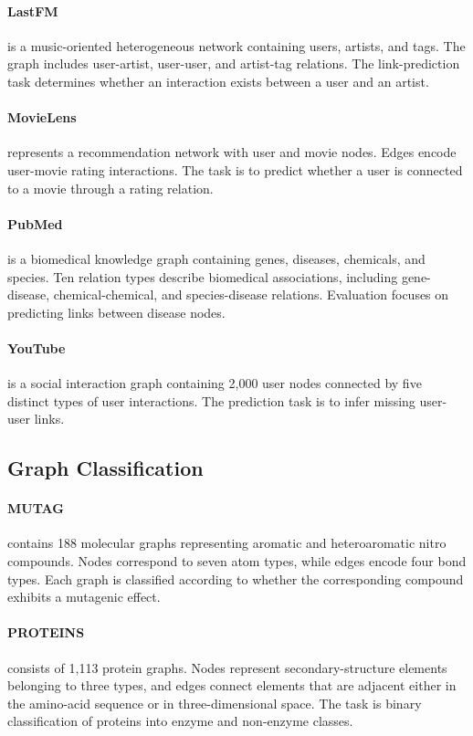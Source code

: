 \paragraph{LastFM}
is a music-oriented heterogeneous network containing users, artists,
and tags. The graph includes user-artist, user-user, and artist-tag
relations. The link-prediction task determines whether an interaction exists
between a user and an artist.

\paragraph{MovieLens}
represents a recommendation network with user and movie nodes.
Edges encode user-movie rating interactions. The task is to predict whether a
user is connected to a movie through a rating relation.

\paragraph{PubMed}
is a biomedical knowledge graph containing genes, diseases, chemicals,
and species. Ten relation types describe biomedical associations, including
gene-disease, chemical-chemical, and species-disease relations. Evaluation
focuses on predicting links between disease nodes.

\paragraph{YouTube}
is a social interaction graph containing 2,000 user nodes connected by
five distinct types of user interactions. The prediction task is to infer
missing user-user links.

\subsection{Graph Classification}

\paragraph{MUTAG}
contains 188 molecular graphs representing aromatic and heteroaromatic
nitro compounds. Nodes correspond to seven atom types, while edges encode four
bond types. Each graph is classified according to whether the corresponding
compound exhibits a mutagenic effect.
\paragraph{PROTEINS}
consists of 1,113 protein graphs. Nodes represent secondary-structure
elements belonging to three types, and edges connect elements that are
adjacent either in the amino-acid sequence or in three-dimensional space. The
task is binary classification of proteins into enzyme and non-enzyme classes.
